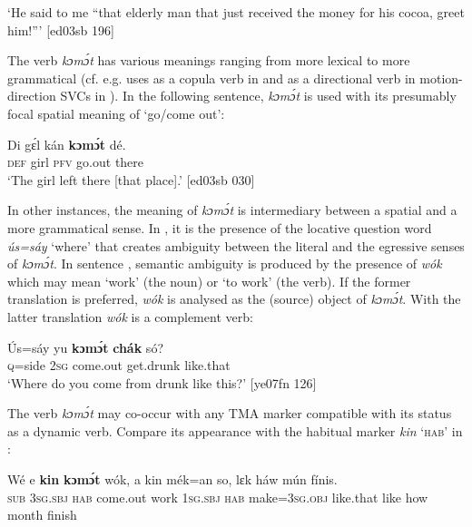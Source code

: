 \glt ‘He said to me “that elderly man that just received the money for his cocoa, 
greet him!”’ [ed03sb 196]
\z

The verb \textit{kɔmɔ́t} has various meanings ranging from more lexical to more grammatical (cf. e.g. uses as a copula verb in  and as a directional verb in motion-direction SVCs in ). In the following sentence, \textit{kɔmɔ́t} is used with its presumably focal spatial meaning of ‘go/come out’: 


\ea%
    \label{ex:key:355}
    \gll Di  gɛ́l  kán  \textbf{kɔmɔ́t}  dé.\\
\textsc{def}  girl  \textsc{pfv}  go.out  there\\

\glt ‘The girl left there [that place].’ [ed03sb 030]
\z

In other instances, the meaning of \textit{kɔmɔ́t} is intermediary between a spatial and a more grammatical sense. In , it is the presence of the locative question word \textit{ús=sáy} ‘where’ that creates ambiguity between the literal and the egressive senses of \textit{kɔmɔ́t}. In sentence , semantic ambiguity is produced by the presence of \textit{wók} which may mean ‘work’ (the noun) or ‘to work’ (the verb). If the former translation is preferred, \textit{wók} is analysed as the (source) object of \textit{kɔmɔ́t}. With the latter translation \textit{wók} is a complement verb:


\ea%
    \label{ex:key:356}
    \gll \'{U}s=sáy  yu  \textbf{kɔmɔ́t} \textbf{chák}   só?\\
\textsc{q}=side  \textsc{2sg}  come.out  get.drunk  like.that\\

\glt ‘Where do you come from drunk like this?’ [ye07fn 126]
\z

The verb \textit{kɔmɔ́t} may co-occur with any TMA marker compatible with its status as a dynamic verb. Compare its appearance with the habitual marker \textit{kin} ‘\textsc{hab}’ in :


\ea%
    \label{ex:key:357}
    \gll Wé  e    \textbf{kin} \textbf{kɔmɔ́t}    wók,  a    kin
mék=an    so,    lɛk  háw  mún    fínis.\\
\textsc{sub}  \textsc{3sg.sbj}  \textsc{hab}  come.out  work  \textsc{1sg.sbj}  \textsc{hab}
make=\textsc{3sg.obj}  like.that  like  how  month  finish\\


